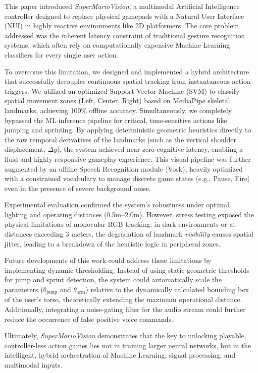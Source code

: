 \documentclass[10pt,twocolumn,a4paper]{article}
\begin{document}
    This paper introduced \textit{SuperMarioVision}, a multimodal Artificial Intelligence controller designed to replace physical gamepads with a Natural User Interface (NUI) in highly reactive environments like 2D platformers. The core problem addressed was the inherent latency constraint of traditional gesture recognition systems, which often rely on computationally expensive Machine Learning classifiers for every single user action.
    
    To overcome this limitation, we designed and implemented a hybrid architecture that successfully decouples continuous spatial tracking from instantaneous action triggers. We utilized an optimized Support Vector Machine (SVM) to classify spatial movement zones (Left, Center, Right) based on MediaPipe skeletal landmarks, achieving 100\% offline accuracy. Simultaneously, we completely bypassed the ML inference pipeline for critical, time-sensitive actions like jumping and sprinting. By applying deterministic geometric heuristics directly to the raw temporal derivatives of the landmarks (such as the vertical shoulder displacement, $\Delta y$), the system achieved near-zero cognitive latency, enabling a fluid and highly responsive gameplay experience. This visual pipeline was further augmented by an offline Speech Recognition module (Vosk), heavily optimized with a constrained vocabulary to manage discrete game states (e.g., Pause, Fire) even in the presence of severe background noise.
    
    Experimental evaluation confirmed the system's robustness under optimal lighting and operating distances (0.5m--2.0m). However, stress testing exposed the physical limitations of monocular RGB tracking: in dark environments or at distances exceeding 3 meters, the degradation of landmark \textit{visibility} causes spatial jitter, leading to a breakdown of the heuristic logic in peripheral zones. 
    
    Future developments of this work could address these limitations by implementing dynamic thresholding. Instead of using static geometric thresholds for jump and sprint detection, the system could automatically scale the parameters ($\theta_{\text{jump}}$ and $\theta_{\text{arm}}$) relative to the dynamically calculated bounding box of the user's torso, theoretically extending the maximum operational distance. Additionally, integrating a noise-gating filter for the audio stream could further reduce the occurrence of false positive voice commands.
    
    Ultimately, \textit{SuperMarioVision} demonstrates that the key to unlocking playable, controller-less action games lies not in training larger neural networks, but in the intelligent, hybrid orchestration of Machine Learning, signal processing, and multimodal inputs.
\end{document}

